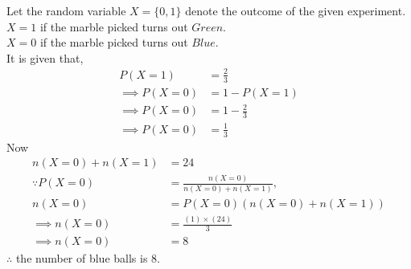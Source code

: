  Let the random variable $X = \{ 0,1 \}$ denote the outcome of the given experiment.
\\$X = 1$ if the marble picked turns out $Green$.
\\$X = 0$ if the marble picked turns out $Blue$.
\\It is given that,
\begin{align}
P(X = 1) &= \frac{2}{3}\\
\implies P(X = 0) &= 1 - P(X = 1)\\
\implies P(X = 0) &= 1 - \frac{2}{3}\\
\implies P(X = 0) &= \frac{1}{3}
\end{align}
Now
\begin{align}
n(X = 0) + n(X = 1) &= 24\\
\because P(X = 0) &= \frac{n(X = 0)}{n(X = 0) + n(X = 1)},\\
 n(X = 0) &= P(X = 0)\left(n(X = 0) + n(X = 1)\right)\\
\implies n(X = 0) &= \frac{(1)\times (24)}{3}\\
\implies n(X = 0) &= 8
\end{align}
$\therefore{}$ the  number of blue balls is 8.

